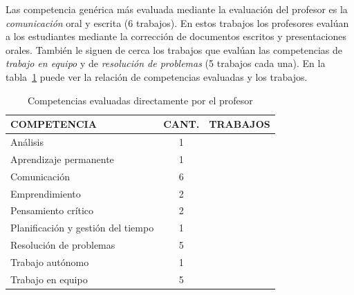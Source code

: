 Las competencia genérica más evaluada mediante la evaluación del profesor es la \emph{comunicación} oral y escrita (6 trabajos). En estos trabajos los profesores evalúan a los estudiantes mediante la corrección de documentos escritos y presentaciones orales. También le siguen de cerca los trabajos que evalúan las competencias de \emph{trabajo en equipo} y de \emph{resolución de problemas} (5 trabajos cada una). En la tabla~\ref{tab:CompetenciasProfesor} puede ver la relación de competencias evaluadas y los trabajos.

\begin{table}
  \begin{center}
  \begin{tabular}{| m{6cm} | c | m{5cm} |}
    \hline
    COMPETENCIA & CANT. & TRABAJOS\\
    \hline
    \hline
    Análisis & 1 & \cite{aziz2007appraisal} \\
    \hline
    Aprendizaje permanente & 1 & \cite{rashid2008engineering} \\
    \hline
    Comunicación & 6 &  \cite{lacuesta2009active,martin2013acquired,rodriguez2010portfolio,benlloch2007adapting,yang2014fine,rashid2008engineering} \\
    \hline
    Emprendimiento & 2 & \cite{ward2011developing,rashid2008engineering} \\
    \hline
    Pensamiento crítico & 2 & \cite{lacuesta2009active,aziz2007appraisal} \\
    \hline
    Planificación y gestión del tiempo & 1 & \cite{lacuesta2009active} \\
    \hline
    Resolución de problemas & 5 & \cite{martin2013acquired,rodriguez2010portfolio,benlloch2007adapting,vizcarro2013assessment,aziz2007appraisal} \\
    \hline
    Trabajo autónomo & 1 &  \cite{lasa2013problem} \\
    \hline
    Trabajo en equipo & 5 &  \cite{lacuesta2009active,martin2013acquired,rodriguez2010portfolio,benlloch2007adapting,rashid2008engineering} \\
    \hline
  \end{tabular}
\end{center}
\caption{Competencias evaluadas directamente por el profesor}
\label{tab:CompetenciasProfesor}
\end{table}
 



